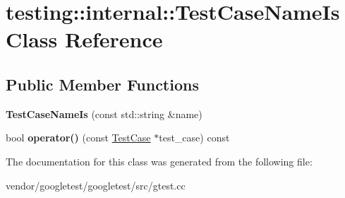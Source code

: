 \hypertarget{classtesting_1_1internal_1_1_test_case_name_is}{}\section{testing\+:\+:internal\+:\+:Test\+Case\+Name\+Is Class Reference}
\label{classtesting_1_1internal_1_1_test_case_name_is}
\subsection*{Public Member Functions}
\begin{DoxyCompactItemize}
\item 
\mbox{\label{classtesting_1_1internal_1_1_test_case_name_is_a7c983707f4cfe7f36dbabc95da5113c4}} 
{\bfseries Test\+Case\+Name\+Is} (const std\+::string \&name)
\item 
\mbox{\label{classtesting_1_1internal_1_1_test_case_name_is_aa96c4e9facbaa7043c8f0b34465d1eae}} 
bool {\bfseries operator()} (const \hyperlink{classtesting_1_1_test_case}{Test\+Case} $\ast$test\+\_\+case) const
\end{DoxyCompactItemize}


The documentation for this class was generated from the following file\+:\begin{DoxyCompactItemize}
\item 
vendor/googletest/googletest/src/gtest.\+cc\end{DoxyCompactItemize}
